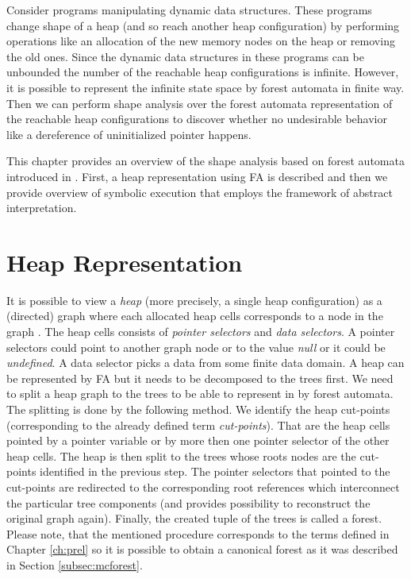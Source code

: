 Consider programs manipulating dynamic data structures.
These programs change shape of a heap (and so reach another heap configuration)
by performing operations like an allocation of the new memory nodes on the heap
or removing the old ones.
Since the dynamic data structures in these programs can be
unbounded the number of the reachable heap configurations is infinite.
However, it is possible to represent the infinite state space by forest automata in finite way.
Then we can perform shape analysis over the forest automata representation of the reachable
heap configurations to discover whether no undesirable behavior
like a dereference of uninitialized pointer happens.

This chapter provides an overview of the shape analysis based on forest automata introduced in \cite{forester12}.
First, a heap representation using FA is described and then
we provide overview of symbolic execution that employs the framework of abstract interpretation.

\section{Heap Representation}
\label{sec:hd}

It is possible to view a \emph{heap} (more precisely, a single heap configuration)
as a (directed) graph where each allocated heap cells corresponds to a node in the graph \cite{forester13}.
The heap cells consists of \emph{pointer selectors} and \emph{data selectors}.
A pointer selectors could point to another graph node or to the value \emph{null} or it could be \emph{undefined}.
A data selector picks a data from some finite data domain.
A heap can be represented by FA but it needs to be decomposed
to the trees first.
We need to split a heap graph to the trees to be able to represent in by forest automata.
The splitting is done by the following method.
We identify the heap cut-points (corresponding to the already defined term \emph{cut-points}).
That are the heap cells pointed by a pointer variable or by more then one pointer selector of
the other heap cells.
The heap is then split to the trees whose roots nodes are the cut-points identified in the previous step.
The pointer selectors that pointed to the cut-points are redirected to the corresponding root references which interconnect
the particular tree components (and provides possibility to reconstruct the original graph again).
Finally, the created tuple of the trees is called a forest.
Please note, that the mentioned procedure corresponds to the terms defined in Chapter \ref{ch:prel}
so it is possible to obtain a canonical forest as it was described in Section \ref{subsec:mcforest}.

